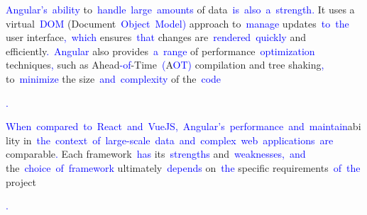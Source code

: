\documentclass{article}
\begin{document}
\begin{tcolorbox}[colframe=black,colback=white]
{}\textcolor{blue}{Angular}\textcolor{blue}{'s}\textcolor{blue}{~ability} to\textcolor{blue}{~handle}\textcolor{blue}{~large}\textcolor{blue}{~amounts} of data\textcolor{blue}{~is}\textcolor{blue}{~also}\textcolor{blue}{~a}\textcolor{blue}{~strength}\textcolor{blue}{.} It uses a virtual\textcolor{blue}{~DOM} (Document\textcolor{blue}{~Object}\textcolor{blue}{~Model}\textcolor{blue}{)} approach to\textcolor{blue}{~manage} updates\textcolor{blue}{~to}\textcolor{blue}{~the} user interface\textcolor{blue}{,}\textcolor{blue}{~which} ensures\textcolor{blue}{~that} changes are\textcolor{blue}{~rendered}\textcolor{blue}{~quickly} and efficiently\textcolor{blue}{.}\textcolor{blue}{~Angular} also provides\textcolor{blue}{~a}\textcolor{blue}{~range} of performance\textcolor{blue}{~optimization} techniques\textcolor{blue}{,} such as Ahead\textcolor{blue}{-of}-Time\textcolor{blue}{~(}A\textcolor{blue}{OT}\textcolor{blue}{)} compilation and tree shaking\textcolor{blue}{,} to\textcolor{blue}{~minimize} the size\textcolor{blue}{~and}\textcolor{blue}{~complexity} of the\textcolor{blue}{~code}\textcolor{blue}{.

}\textcolor{blue}{When}\textcolor{blue}{~compared}\textcolor{blue}{~to}\textcolor{blue}{~React}\textcolor{blue}{~and}\textcolor{blue}{~Vue}\textcolor{blue}{JS}\textcolor{blue}{,}\textcolor{blue}{~Angular}\textcolor{blue}{'s}\textcolor{blue}{~performance}\textcolor{blue}{~and}\textcolor{blue}{~maintain}ability in\textcolor{blue}{~the}\textcolor{blue}{~context}\textcolor{blue}{~of}\textcolor{blue}{~large}\textcolor{blue}{-scale}\textcolor{blue}{~data}\textcolor{blue}{~and}\textcolor{blue}{~complex}\textcolor{blue}{~web}\textcolor{blue}{~applications}\textcolor{blue}{~are} comparable\textcolor{blue}{.} Each framework\textcolor{blue}{~has} its\textcolor{blue}{~strengths} and\textcolor{blue}{~weaknesses}\textcolor{blue}{,}\textcolor{blue}{~and} the\textcolor{blue}{~choice}\textcolor{blue}{~of}\textcolor{blue}{~framework} ultimately\textcolor{blue}{~depends} on\textcolor{blue}{~the} specific requirements\textcolor{blue}{~of}\textcolor{blue}{~the} project\textcolor{blue}{.

}
\end{tcolorbox}
\end{document}
